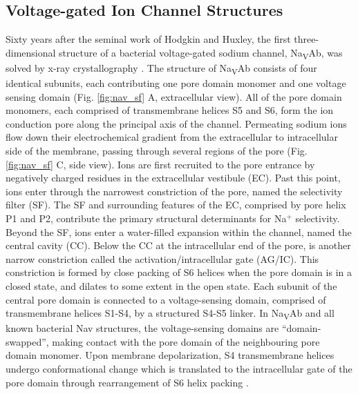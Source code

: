 \begin{refsection}

\subsection{Voltage-gated Ion Channel Structures}

Sixty years after the seminal work of Hodgkin and Huxley, the first three-dimensional structure of a bacterial voltage-gated sodium channel, Na\textsubscript{V}Ab, was solved by x-ray crystallography \cite{Payandeh:2012ib,Catterall:2012fh}. The structure of Na\textsubscript{V}Ab consists of four identical subunits, each contributing one pore domain monomer and one voltage sensing domain (Fig. \ref{fig:nav_sf} A, extracellular view). All of the pore domain monomers, each comprised of transmembrane helices S5 and S6, form the ion conduction pore along the principal axis of the channel. Permeating sodium ions flow down their electrochemical gradient from the extracellular to intracellular side of the membrane, passing through several regions of the pore (Fig. \ref{fig:nav_sf} C, side view). Ions are first recruited to the pore entrance by negatively charged residues in the extracellular vestibule (EC). Past this point, ions enter through the narrowest constriction of the pore, named the selectivity filter (SF). The SF and surrounding features of the EC, comprised by pore helix P1 and P2, contribute the primary structural determinants for Na$^+$ selectivity. Beyond the SF, ions enter a water-filled expansion within the channel, named the central cavity (CC). Below the CC at the intracellular end of the pore, is another narrow constriction called the activation/intracellular gate (AG/IC). This constriction is formed by close packing of S6 helices when the pore domain is in a closed state, and dilates to some extent in the open state. Each subunit of the central pore domain is connected to a voltage-sensing domain, comprised of transmembrane helices S1-S4, by a structured S4-S5 linker. In Na\textsubscript{V}Ab and all known bacterial Nav structures, the voltage-sensing domains are ``domain-swapped'', making contact with the pore domain of the neighbouring pore domain monomer. Upon membrane depolarization, S4 transmembrane helices undergo conformational change which is translated to the intracellular gate of the pore domain through rearrangement of S6 helix packing \cite{Vargas:2012ek,Long:2005hl,Jensen:2012ee,Catterall:2015dh}. 


\end{refsection}
